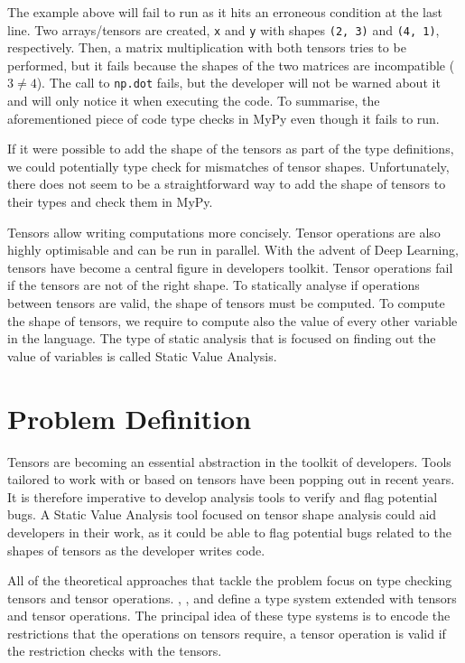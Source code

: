 The example above will fail to run as it hits an erroneous condition at the last line. Two
arrays/tensors are created, \texttt{x} and \texttt{y} with shapes \texttt{(2,\ 3)} and
\texttt{(4,\ 1)}, respectively. Then, a matrix multiplication with both tensors tries to
be performed, but it fails because the shapes of the two matrices are incompatible
(\(3\ne4\)). The call to \texttt{np.dot} fails, but the developer will not be warned about
it and will only notice it when executing the code. To summarise, the aforementioned piece
of code type checks in MyPy even though it fails to run.

If it were possible to add the shape of the tensors as part of the type definitions, we
could potentially type check for mismatches of tensor shapes. Unfortunately, there does
not seem to be a straightforward way to add the shape of tensors to their types and check
them in MyPy.

Tensors allow writing computations more concisely. Tensor operations are also highly
optimisable and can be run in parallel. With the advent of Deep Learning, tensors have
become a central figure in developers toolkit.  Tensor operations fail if the tensors are
not of the right shape. To statically analyse if operations between tensors are valid, the
shape of tensors must be computed. To compute the shape of tensors, we require to compute
also the value of every other variable in the language. The type of static analysis that
is focused on finding out the value of variables is called Static Value Analysis.

\section{Problem Definition}\label{problem-definition}

Tensors are becoming an essential abstraction in the toolkit of
developers. Tools tailored to work with or based on tensors have been
popping out in recent years. It is therefore imperative to develop
analysis tools to verify and flag potential bugs. A Static Value
Analysis tool focused on tensor shape analysis could aid developers in
their work, as it could be able to flag potential bugs related to the
shapes of tensors as the developer writes code.

All of the theoretical approaches that tackle the problem focus on type
checking tensors and tensor operations. \textcite{griffioen_type_2015},
\textcite{slepak_array-oriented_2014}, and \textcite{rink_modeling_2018}
define a type system extended with tensors and tensor operations. The
principal idea of these type systems is to encode the restrictions that
the operations on tensors require, a tensor operation is valid if the
restriction checks with the tensors.

